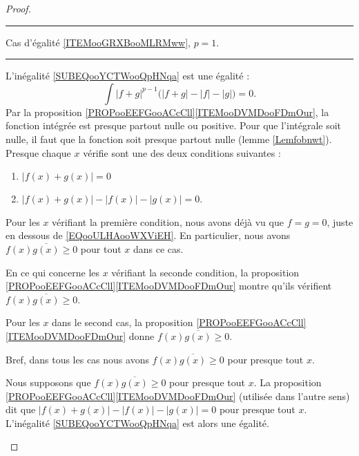 \begin{proof}
	\begin{center}
		\noindent\rule{2cm}{0.4pt}
		Cas d'égalité \ref{ITEMooGRXBooMLRMww}, $p=1$.
		\noindent\rule{2cm}{0.4pt}
	\end{center}

	\begin{subproof}
		\spitem[\( \Rightarrow\)]

		L'inégalité \eqref{SUBEQooYCTWooQpHNqa} est une égalité :
		\begin{equation}
			\int | f+g |^{p-1}\big( | f+g |-| f |-| g | \big)=0.
		\end{equation}
		Par la proposition \ref{PROPooEEFGooACcCll}\ref{ITEMooDVMDooFDmOur}, la fonction intégrée est presque partout nulle ou positive. Pour que l'intégrale soit nulle, il faut que la fonction soit presque partout nulle (lemme \ref{Lemfobnwt}). Presque chaque \( x\) vérifie sont une des deux conditions suivantes :
		\begin{enumerate}
			\item
			      \( | f(x)+g(x) |=0\)
			\item
			      \( | f(x)+g(x) |-| f(x) |-| g(x) |=0\).
		\end{enumerate}
		Pour les \( x\) vérifiant la première condition, nous avons déjà vu que \( f=g=0\), juste en dessous de \eqref{EQooULHAooWXViEH}. En particulier, nous avons \( f(x)\overline{g(x)}\geq 0\) pour tout \( x\) dans ce cas.

		En ce qui concerne les \( x\) vérifiant la seconde condition, la proposition \ref{PROPooEEFGooACcCll}\ref{ITEMooDVMDooFDmOur} montre qu'ils vérifient \( f(x)\overline{g(x)}\geq 0\).

		Pour les \( x\) dans le second cas, la proposition \ref{PROPooEEFGooACcCll}\ref{ITEMooDVMDooFDmOur} donne $f(x)\overline{g(x)}\geq 0$.

		Bref, dans tous les cas nous avons \( f(x)\overline{g(x)}\geq 0\) pour presque tout \( x\).
		\spitem[\( \Leftarrow\)]

		Nous supposons que \( f(x)\overline{g(x)}\geq 0\) pour presque tout \( x\). La proposition \ref{PROPooEEFGooACcCll}\ref{ITEMooDVMDooFDmOur} (utilisée dans l'autre sens) dit que \( | f(x)+g(x) |-| f(x) |-| g(x) |=0\) pour presque tout \( x\). L'inégalité \eqref{SUBEQooYCTWooQpHNqa} est alors une égalité.

	\end{subproof}



\end{proof}
